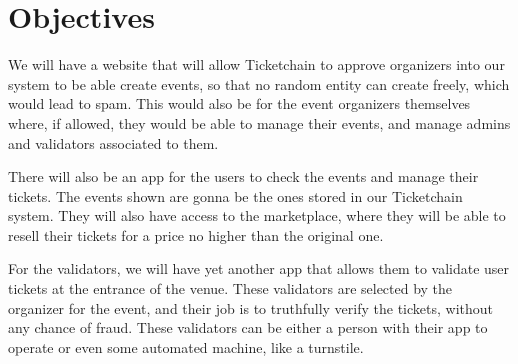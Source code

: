\section{Objectives}

We will have a website that will allow Ticketchain to approve organizers into our system to be able create events, so that no random entity can create freely, which would lead to spam. This would also be for the event organizers themselves where, if allowed, they would be able to manage their events, and manage admins and validators associated to them.

There will also be an app for the users to check the events and manage their tickets. The events shown are gonna be the ones stored in our Ticketchain system. They will also have access to the marketplace, where they will be able to resell their tickets for a price no higher than the original one.

For the validators, we will have yet another app that allows them to validate user tickets at the entrance of the venue. These validators are selected by the organizer for the event, and their job is to truthfully verify the tickets, without any chance of fraud. These validators can be either a person with their app to operate or even some automated machine, like a turnstile.
